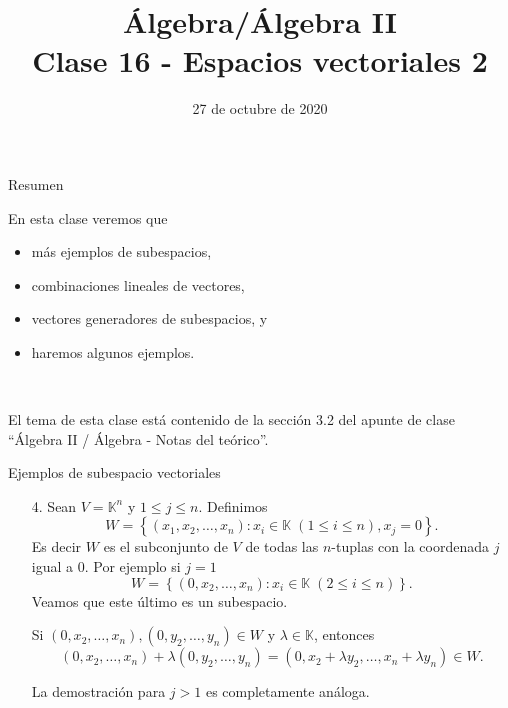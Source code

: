 \documentclass[handout]{beamer} %
\title[Clase 16 - Espacios vectoriales 2]{Álgebra/Álgebra II \\ Clase 16 - Espacios vectoriales 2}
\author[]{}
\institute[]{\normalsize FAMAF / UNC
	\\[\baselineskip] ${}^{}$
	\\[\baselineskip]
}
\date[27/10/2020]{27 de octubre de 2020}
\newcommand{\K}{\mathbb K}
\begin{document}
\begin{frame}
\maketitle
\end{frame}

\begin{frame}{Resumen}
	
    En esta clase veremos que
    \begin{itemize}
    \item más ejemplos de subespacios, 
     \item combinaciones lineales de vectores,
     \item vectores generadores de subespacios,  y
     \item haremos algunos ejemplos.
    \end{itemize}
   
    
    \
    
   El tema de esta clase  está contenido de la sección 3.2 del apunte de clase ``Álgebra II / Álgebra - Notas del teórico''.
    \end{frame}
    
   
        \begin{frame}{Ejemplos de subespacio vectoriales}
        
       
            \begin{enumerate}     
                \item[4.] Sean $V=\K^n$ y $1\le j \le n$. Definimos 
                $$
                W = \left\{ (x_1,x_2,\ldots,x_n): x_i \in \K\; (1 \le i \le n), x_j =0\right\}.
                $$
                Es decir $W$  es el subconjunto de $V$ de todas las $n$-tuplas con la coordenada $j$ igual a 0. Por ejemplo  si $j=1$ 
                $$
                W = \left\{ (0,x_2,\ldots,x_n): x_i \in \K \;(2 \le i \le n)\right\}.
                $$
                \pause
                Veamos que este último es un subespacio.
                
                Si $(0,x_2,\ldots,x_n), (0,y_2,\ldots,y_n) \in W$ y  $\lambda \in \K$,  entonces
                $$(0,x_2,\ldots,x_n)+ \lambda(0,y_2,\ldots,y_n) = (0,x_2+\lambda y_2,\ldots,x_n+\lambda y_n) \in W.$$
                
                
                La demostración para $j >1$ es completamente análoga. 
            \end{enumerate}

        
        \end{frame}
        
\end{document}
